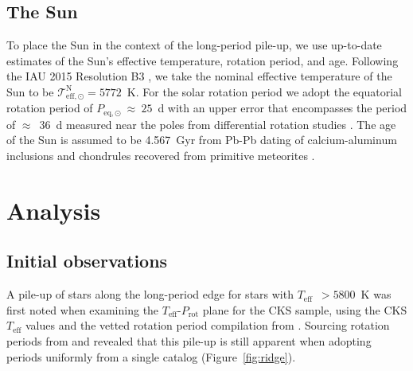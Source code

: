 \documentclass[twocolumn]{aastex631}
\newcommand{\teff}{\ensuremath{T_{\mathrm{eff}}}\xspace}
\newcommand{\prot}{\ensuremath{P_\mathrm{rot}}\xspace}
\begin{document}
\subsection{The Sun}
To place the Sun in the context of the long-period pile-up, we use up-to-date estimates of the Sun's effective temperature, rotation period, and age. Following the IAU 2015 Resolution B3 \citep{Mamajek2015}, we take the nominal effective temperature of the Sun to be $\mathcal{T}^\mathrm{N}_\mathrm{eff,\odot} = 5772$~K. For the solar rotation period we adopt the equatorial rotation period of $P_\mathrm{eq,\odot}~\approx~25$~d with an upper error that encompasses the period of $\approx$~36~d measured near the poles from differential rotation studies \citep[][and references therein]{Thompson2003}.  The age of the Sun is assumed to be 4.567~Gyr from Pb-Pb dating of calcium-aluminum inclusions and chondrules recovered from primitive meteorites \citep{Bahcall1995}.




\section{Analysis}
\label{sec:analysis}

\subsection{Initial observations}
A pile-up of stars along the long-period edge for stars with \teff~$>5800$~K was first noted when examining the \teff-\prot plane for the CKS sample, using the CKS \teff values and the vetted rotation period compilation from \citet{David2021}. Sourcing rotation periods from \citet{McQuillan2013, Mazeh2015} and \citet{Angus2018} revealed that this pile-up is still apparent when adopting periods uniformly from a single catalog (Figure~\ref{fig:ridge}). 
\end{document}
